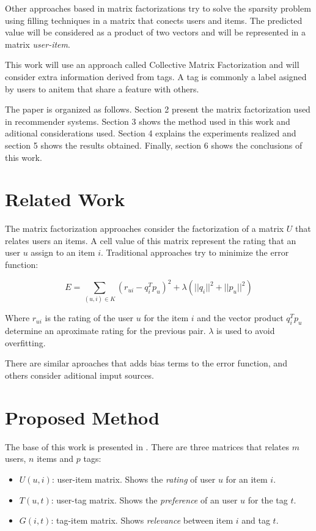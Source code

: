 \documentclass{sig-alternate}
\begin{document}
Other approaches based in matrix factorizations \cite{koren2009matrix} try to solve the sparsity problem using filling techniques in a matrix that conects users and items. The predicted value will be considered as a product of two vectors and will be represented in a matrix \textit{user-item}.

This work will use an approach called Collective Matrix Factorization and will consider extra information derived from tags. A tag is commonly a label asigned by users to anitem that share a feature with others.

The paper is organized as follows. Section 2 present the matrix factorization used in recommender systems. Section 3 shows the method used in this work and aditional considerations used. Section 4 explains the experiments realized and section 5 shows the results obtained. Finally, section 6 shows the conclusions of this work.

\section{Related Work}

The matrix factorization approaches \cite{koren2009matrix} consider the factorization of a matrix $U$ that relates users an items. A cell value of this matrix represent the rating that an user $u$ assign to an item $i$. Traditional approaches try to minimize the error function:

\begin{equation}
E = \sum_{(u,i)\in K} (r_{ui}-q_i^Tp_{u})^2 + \lambda(||q_i||^2+||p_u||^2)
\end{equation}

Where $r_{ui}$ is the rating of the user $u$ for the item $i$ and the vector product $q_i^Tp_u$ determine an aproximate rating for the previous pair. $\lambda$ is used to avoid overfitting.

There are similar aproaches that adds bias terms to the error function, and others consider aditional imput sources. 

\section{Proposed Method}

The base of this work is presented in \cite{tag}. There are three matrices that relates $m$ users, $n$ items and $p$ tags:
\begin{itemize}
\item $U(u,i)$: user-item matrix. Shows the \textit{rating} of user $u$ for an item $i$.
\item $T(u,t)$: user-tag matrix. Shows the \textit{preference} of an user $u$ for the tag $t$.
\item $G(i,t)$: tag-item matrix. Shows \textit{relevance} between item $i$ and tag $t$.
\end{itemize}
\end{document}
